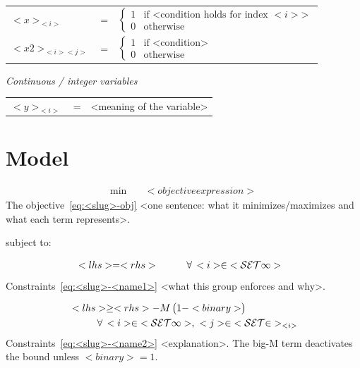 \begin{tabular}{p{10mm}lp{120mm}}
    $<x>_{<i>}$ & = & $\left\{ \begin{array}{ll}
                        1 & \mbox{if <condition holds for index $<i>$>} \\
                        0 & \mbox{otherwise}
                      \end{array} \right.$ \\[2mm]
    $<x2>_{<i><j>}$ & = & $\left\{ \begin{array}{ll}
                        1 & \mbox{if <condition>} \\
                        0 & \mbox{otherwise}
                      \end{array} \right.$ \\
\end{tabular}

\bigskip
\noindent \textit{Continuous / integer variables}

\begin{tabular}{p{14mm}lp{108mm}}
    $<y>_{<i>}$ & = & <meaning of the variable> \\
\end{tabular}

\section{Model}\label{sec:<slug>-model}

\begin{align}
  \min \quad & <objective expression> \label{eq:<slug>-obj}
\end{align}
The objective~\eqref{eq:<slug>-obj} <one sentence: what it minimizes/maximizes
and what each term represents>.

\medskip
\noindent subject to:

\begin{align}
  & <lhs> = <rhs>
    \hspace{10mm} \forall\, <i> \in \mathcal{<SET1>}
    \label{eq:<slug>-<name1>}
\end{align}
Constraints~\eqref{eq:<slug>-<name1>} <what this group enforces and why>.

\begin{align}
  & <lhs> \ge <rhs> - M\,\bigl(1 - <binary>\bigr) \notag \\
  & \hspace{10mm} \forall\, <i> \in \mathcal{<SET1>},\ <j> \in \mathcal{<SET2>}_{<i>}
    \label{eq:<slug>-<name2>}
\end{align}
Constraints~\eqref{eq:<slug>-<name2>} <explanation>. The big-M term deactivates
the bound unless $<binary> = 1$.

